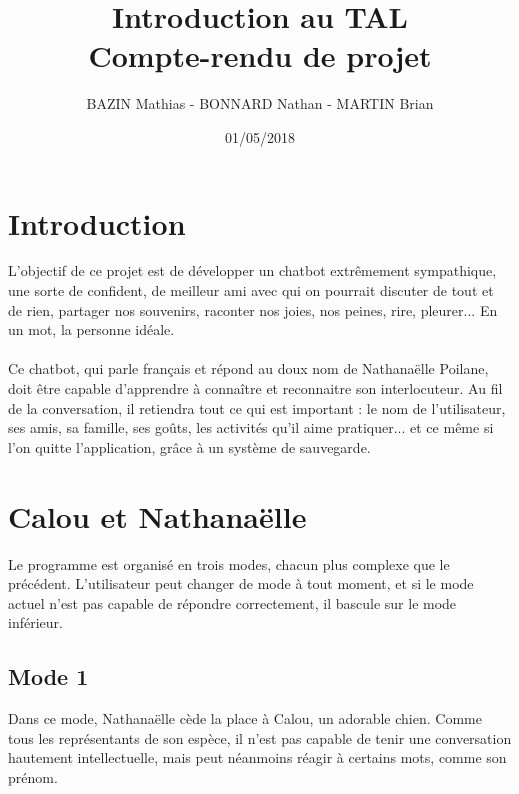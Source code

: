 \documentclass[paper=a4, fontsize=11pt]{article}
\begin{document}
\title{Introduction au TAL\\Compte-rendu de projet}
\author{BAZIN Mathias - BONNARD Nathan - MARTIN Brian}
\date{01/05/2018}
\maketitle

\vspace{3.0cm}

\section{Introduction}

L'objectif de ce projet est de développer un chatbot extrêmement sympathique, une sorte de confident, de meilleur ami avec qui on pourrait discuter de tout et de rien, partager nos souvenirs, raconter nos joies, nos peines, rire, pleurer... En un mot, la personne idéale.
\paragraph{} Ce chatbot, qui parle français et répond au doux nom de Nathanaëlle Poilane, doit être capable d'apprendre à connaître et reconnaitre son interlocuteur. Au fil de la conversation, il retiendra tout ce qui est important : le nom de l'utilisateur, ses amis, sa famille, ses goûts, les activités qu'il aime pratiquer... et ce même si l'on quitte l'application, grâce à un système de sauvegarde.

\vspace{0.5cm}

\section{Calou et Nathanaëlle}

Le programme est organisé en trois modes, chacun plus complexe que le précédent. L'utilisateur peut changer de mode à tout moment, et si le mode actuel n'est pas capable de répondre correctement, il bascule sur le mode inférieur.

\subsection{Mode 1}

Dans ce mode, Nathanaëlle cède la place à Calou, un adorable chien. Comme tous les représentants de son espèce, il n'est pas capable de tenir une conversation hautement intellectuelle, mais peut néanmoins réagir à certains mots, comme son prénom.
\end{document}
